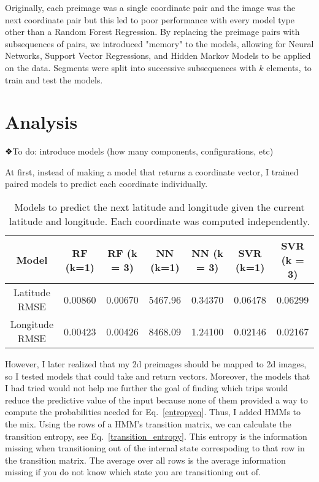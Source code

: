 \documentclass[11pt]{amsart}
\begin{document}
Originally, each preimage was a single coordinate pair and the image was the next coordinate pair but this led to poor performance with every model type other than a Random Forest Regression.
By replacing the preimage pairs with subsequences of pairs, we introduced "memory" to the models, allowing for Neural Networks, Support Vector Regressions, and Hidden Markov Models to be applied on the data.
Segments were split into successive subsequences with $k$ elements, to train and test the models.
\section{Analysis}

❖To do: introduce models (how many components, configurations, etc)

At first, instead of making a model that returns a coordinate vector, I trained paired models to predict each coordinate individually.
\begin{table}[h!]
\centering
\begin{tabular}{|c|c|c|c|c|c|c|}
\hline
Model & RF (k=1) & RF (k = 3) & NN (k=1) & NN (k = 3) & SVR (k=1) & SVR (k = 3)\\ \hline
Latitude RMSE & 0.00860 & 0.00670 & 5467.96 & 0.34370 & 0.06478 & 0.06299 \\ \hline
Longitude RMSE & 0.00423 & 0.00426 & 8468.09 & 1.24100 & 0.02146 & 0.02167 \\ \hline
\end{tabular}
\caption{Models to predict the next latitude and longitude given the current latitude and longitude.
Each coordinate was computed independently.}
\label{table1}
\end{table}

However, I later realized that my 2d preimages should be mapped to 2d images, so I tested models that could take and return vectors.
Moreover, the models that I had tried would not help me further the goal of finding which trips would reduce the predictive value of the input because none of them provided a way to compute the probabilities needed for Eq.~\ref{entropyeq}.
Thus, I added HMMs to the mix.
Using the rows of a HMM's transition matrix, we can calculate the transition entropy, see Eq.~\ref{transition_entropy}.
This entropy is the information missing when transitioning out of the internal state correspoding to that row in the transition matrix.
The average over all rows is the average information missing if you do not know which state you are transitioning out of.
\end{document}
